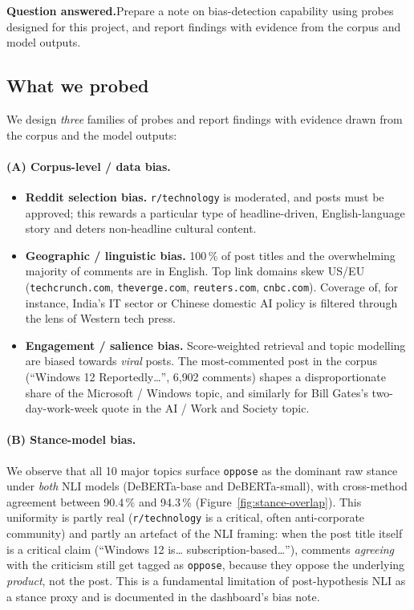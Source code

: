 \documentclass[11pt,a4paper]{article}
\newcommand{\questionanswered}[1]{%
  \par\medskip\noindent\textbf{Question answered.}\quad #1\par\medskip%
}
\begin{document}
\questionanswered{Prepare a note on bias-detection capability using probes designed for this
project, and report findings with evidence from the corpus and model outputs.}

\subsection{What we probed}

We design \emph{three} families of probes and report findings with evidence drawn from the
corpus and the model outputs:

\paragraph{(A) Corpus-level / data bias.}
\begin{itemize}
  \item \textbf{Reddit selection bias.} \texttt{r/technology} is moderated, and posts must be
        approved; this rewards a particular type of headline-driven, English-language story and
        deters non-headline cultural content.
  \item \textbf{Geographic / linguistic bias.} 100\,\% of post titles and the overwhelming
        majority of comments are in English. Top link domains skew US/EU
        (\texttt{techcrunch.com}, \texttt{theverge.com}, \texttt{reuters.com}, \texttt{cnbc.com}).
        Coverage of, for instance, India's IT sector or Chinese domestic AI policy is filtered
        through the lens of Western tech press.
  \item \textbf{Engagement / salience bias.} Score-weighted retrieval and topic modelling are
        biased towards \emph{viral} posts. The most-commented post in the corpus
        (``Windows 12 Reportedly\ldots'', 6{,}902 comments) shapes a disproportionate share of
        the Microsoft / Windows topic, and similarly for Bill Gates's two-day-work-week quote
        in the AI / Work and Society topic.
\end{itemize}

\paragraph{(B) Stance-model bias.}
We observe that all 10 major topics surface \texttt{oppose} as the dominant raw stance
under \emph{both} NLI models (DeBERTa-base and DeBERTa-small), with cross-method agreement
between 90.4\,\% and 94.3\,\% (Figure~\ref{fig:stance-overlap}). This uniformity is partly real
(\texttt{r/technology} is a critical, often anti-corporate community) and partly an artefact of
the NLI framing: when the post title itself is a critical claim (``Windows 12 is\ldots
subscription-based\ldots''), comments \emph{agreeing} with the criticism still get tagged as
\texttt{oppose}, because they oppose the underlying \emph{product}, not the post. This is a
fundamental limitation of post-hypothesis NLI as a stance proxy and is documented in the
dashboard's bias note.
\end{document}
